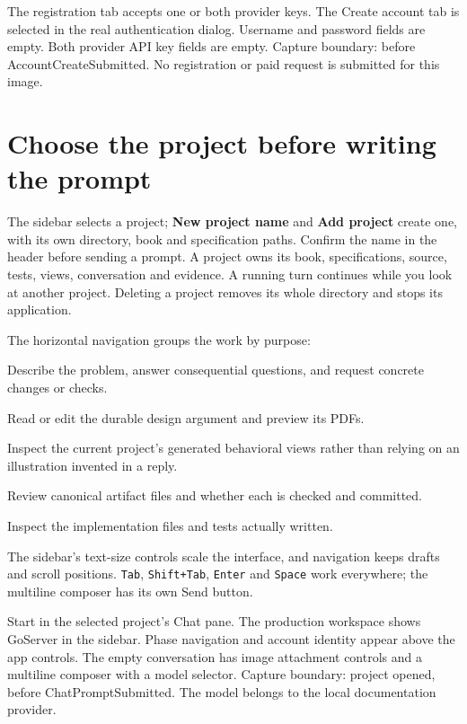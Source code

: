   {The registration tab accepts one or both provider keys.}
  {The Create account tab is selected in the real authentication dialog. Username and password fields are empty. Both provider API key fields are empty.}
  {Capture boundary: before AccountCreateSubmitted. No registration or paid request is submitted for this image.}

\section{Choose the project before writing the prompt}

The sidebar selects a project; \textbf{New project name} and \textbf{Add project}
create one, with its own directory, book and specification paths. Confirm the
name in the header before sending a prompt. A project owns its book,
specifications, source, tests, views, conversation and evidence. A running turn
continues while you look at another project. Deleting a project removes its whole
directory and stops its application.

The horizontal navigation groups the work by purpose:
\begin{description}[style=nextline]
\item[Chat] Describe the problem, answer consequential questions, and request
  concrete changes or checks.
\item[Book] Read or edit the durable design argument and preview its PDFs.
\item[Grammar and Tasks] Inspect the current project's generated behavioral
  views rather than relying on an illustration invented in a reply.
\item[Project memory] Review canonical artifact files and whether each is checked and committed.
\item[Source] Inspect the implementation files and tests actually written.
\end{description}
The sidebar's text-size controls scale the interface, and navigation keeps drafts
and scroll positions. \texttt{Tab}, \texttt{Shift+Tab}, \texttt{Enter} and
\texttt{Space} work everywhere; the multiline composer has its own Send button.

  {Start in the selected project's Chat pane.}
  {The production workspace shows GoServer in the sidebar. Phase navigation and account identity appear above the app controls. The empty conversation has image attachment controls and a multiline composer with a model selector.}
  {Capture boundary: project opened, before ChatPromptSubmitted. The model belongs to the local documentation provider.}

